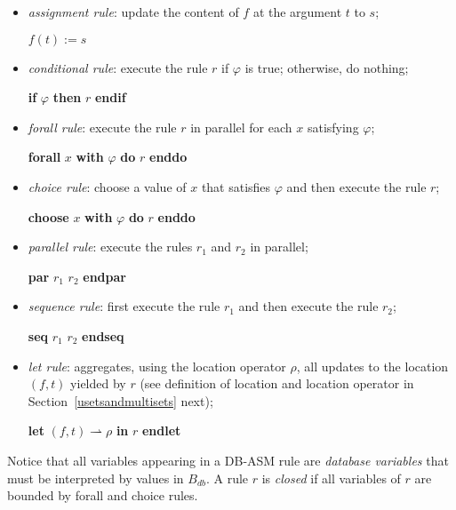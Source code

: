 \documentclass[preprint,11pt]{elsarticle}
\theoremstyle{definition}
\theoremstyle{remark}
\begin{document}
\begin{itemize}

\item {\em assignment rule}: update the content of $f$ at the argument $t$ to
$s$;

\hspace{3cm}$f(t) := s$

\item {\em conditional rule}: execute the rule $r$ if $\varphi$ is true; otherwise, do
nothing;

\hspace{3cm}\textbf{if} $\varphi$ \textbf{then} $r$ \textbf{endif}

\item {\em forall rule}: execute the rule $r$ in parallel for each $x$ satisfying
$\varphi$;

\hspace{3cm}\textbf{forall} $x$ \textbf{with} $\varphi$
\textbf{do} $r$ \textbf{enddo}

\item {\em choice rule}: choose a value of $x$ that satisfies $\varphi$ and then execute the rule $r$;

\hspace{3cm}\textbf{choose} $x$ \textbf{with} $\varphi$
\textbf{do} $r$ \textbf{enddo}

\item {\em parallel rule}: execute the rules $r_1$ and $r_2$ in
parallel;

\hspace{3cm}\textbf{par} $r_1$ $r_2$ \textbf{endpar}

\item {\em sequence rule}: first execute the rule $r_1$ and then execute the rule
$r_2$;

\hspace{3cm}\textbf{seq} $r_1$ $r_2$ \textbf{endseq}

\item {\em let rule}: aggregates, using the location operator $\rho$, all updates to the location $(f,t)$ yielded by $r$ (see definition of location and location operator in Section~\ref{usetsandmultisets} next);

\hspace{3cm}\textbf{let} $(f,t) \!\rightharpoonup\! \rho$ \textbf{in}
$r$ \textbf{endlet}

\end{itemize}
Notice that all variables appearing in a DB-ASM rule are \emph{database
variables} that must be interpreted by values in $B_{db}$. A rule
$r$ is {\em closed} if all variables of $r$ are bounded by forall and
choice rules.
\end{document}
